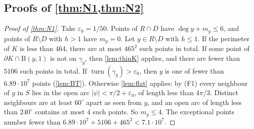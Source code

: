 \documentclass[11pt]{amsart}
\theoremstyle{definition}
\theoremstyle{remark}
\newcommand{\eps}{\varepsilon}
\newcommand{\turn}{\operatorname{turn}}
\newcommand{\Dd}{\mathrm{B}}      %
\begin{document}
\subsection{Proofs of \texorpdfstring{\cref{thm:N1,thm:N2}}{Theorems N1 and N2}}
\begin{proof}[Proof of \cref{thm:N1}]
Take $\eps_0=1/50$. Points of $R\cap D$ have $\deg y+m_y\le6$, and points of $R\setminus D$ with $h>1$ have $m_y=0$. Let $y\in R\setminus D$ with $h\le1$. If the perimeter of $K$ is less than $464$, there are at most $465^2$ such points in total. If some point of $\partial K\cap\Dd(y,1)$ is not on $\gamma_y$, then \cref{lem:thinK} applies, and there are fewer than $5106$ such points in total. If $\turn(\gamma_y)>\eps_0$, then $y$ is one of fewer than $6.89\cdot10^7$ points (\cref{lem:BT}). Otherwise \cref{lem:flat} applies: by (F1) every neighbour of $y$ in $S$ lies in the open arc $|\psi|<\pi/2+\eps_0$, of length less than $4\pi/3$. Distinct neighbours are at least $60^\circ$ apart as seen from $y$, and an open arc of length less than $240^\circ$ contains at most $4$ such points. So $m_y\le4$. The exceptional points number fewer than $6.89\cdot10^7+5106+465^2<7.1\cdot10^7$.
\end{proof}
\end{document}
